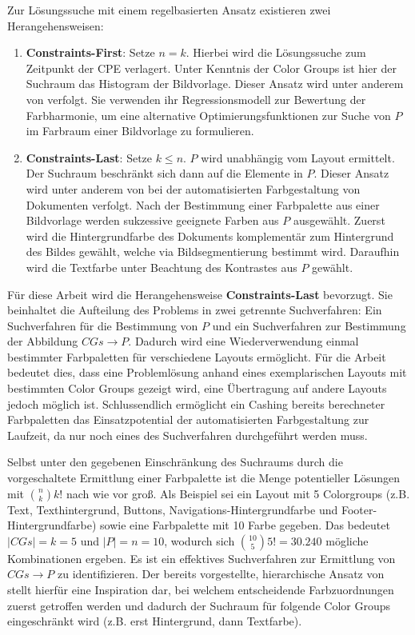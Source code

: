 \documentclass[11pt,a4paper,bibliography=totoc,twocolumn]{scrartcl}
\begin{document}
Zur Lösungssuche mit einem regelbasierten Ansatz existieren zwei Herangehensweisen:
\begin{enumerate}
    \item \textbf{Constraints-First}: Setze $n = k$. Hierbei wird die Lösungssuche zum Zeitpunkt der CPE verlagert. Unter Kenntnis der Color Groups ist hier der Suchraum das Histogram der Bildvorlage. Dieser Ansatz wird unter anderem von \citet{colorcomp} verfolgt. Sie verwenden ihr Regressionsmodell zur Bewertung der Farbharmonie, um eine alternative Optimierungsfunktionen zur Suche von $P$ im Farbraum einer Bildvorlage zu formulieren.
    \item \textbf{Constraints-Last}: Setze $k \leq n$. $P$ wird unabhängig vom Layout ermittelt. Der Suchraum beschränkt sich dann auf die Elemente in $P$. Dieser Ansatz wird unter anderem von \citet{documentpalette} bei der automatisierten Farbgestaltung von Dokumenten verfolgt. Nach der Bestimmung einer Farbpalette aus einer Bildvorlage werden sukzessive geeignete Farben aus $P$ ausgewählt. Zuerst wird die Hintergrundfarbe des Dokuments komplementär zum Hintergrund des Bildes gewählt, welche via Bildsegmentierung bestimmt wird. Daraufhin wird die Textfarbe unter Beachtung des Kontrastes aus $P$ gewählt.
\end{enumerate}

Für diese Arbeit wird die Herangehensweise \textbf{Constraints-Last} bevorzugt. Sie beinhaltet die Aufteilung des Problems in zwei getrennte Suchverfahren: Ein Suchverfahren für die Bestimmung von $P$ und ein Suchverfahren zur Bestimmung der Abbildung $CGs \to P$. Dadurch wird eine Wiederverwendung einmal bestimmter Farbpaletten für verschiedene Layouts ermöglicht. Für die Arbeit bedeutet dies, dass eine Problemlösung anhand eines exemplarischen Layouts mit bestimmten Color Groups gezeigt wird, eine Übertragung auf andere Layouts jedoch möglich ist. Schlussendlich ermöglicht ein Cashing bereits berechneter Farbpaletten das Einsatzpotential der automatisierten Farbgestaltung zur Laufzeit, da nur noch eines des Suchverfahren durchgeführt werden muss.

Selbst unter den gegebenen Einschränkung des Suchraums durch die vorgeschaltete Ermittlung einer Farbpalette ist die Menge potentieller Lösungen mit $\binom{n}{k} k!$ nach wie vor groß. Als Beispiel sei ein Layout mit 5 Colorgroups (z.B. Text, Texthintergrund, Buttons, Navigations-Hintergrundfarbe und Footer-Hintergrundfarbe) sowie eine Farbpalette mit 10 Farbe gegeben. Das bedeutet $|CGs| = k = 5$ und $|P| = n = 10$, wodurch sich $\binom{10}{5} 5! = 30.240$ mögliche Kombinationen ergeben. Es ist ein effektives Suchverfahren zur Ermittlung von $CGs \to P$ zu identifizieren. Der bereits vorgestellte, hierarchische Ansatz von \citet{documentpalette} stellt hierfür eine Inspiration dar, bei welchem entscheidende Farbzuordnungen zuerst getroffen werden und dadurch der Suchraum für folgende Color Groups eingeschränkt wird (z.B. erst Hintergrund, dann Textfarbe).
\end{document}
